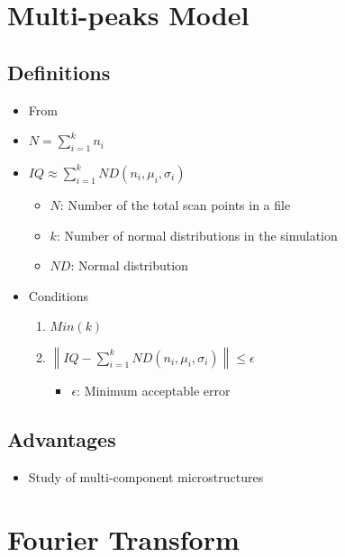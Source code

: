\documentclass[letterpaper]{article}
\begin{document}
\newpage
	\section{Multi-peaks Model}
		\subsection{Definitions}
			\begin{itemize}
				\item From \cite{Wu2005}
				\item $N = \sum\limits_{i=1}^k {n_i}$
				\item $IQ \approx \sum\limits_{i=1}^k {ND(n_i, \mu_i, \sigma_i)}$
					\begin{itemize}
						\item $N$: Number of the total scan points in a file
						\item $k$: Number of normal distributions in the simulation
						\item $ND$: Normal distribution
					\end{itemize}
				\item Conditions
					\begin{enumerate}
						\item $Min(k)$
						\item $\left\| IQ - \sum\limits_{i=1}^k {ND(n_i, \mu_i, \sigma_i)} \right\| \leq \epsilon$
							\begin{itemize}
								\item $\epsilon$: Minimum acceptable error
							\end{itemize}
					\end{enumerate}
			\end{itemize}
		
		\subsection{Advantages}
			\begin{itemize}
				\item Study of multi-component microstructures \cite{Wu2005}
			\end{itemize}
	
\newpage
	\section{Fourier Transform}
\end{document}
